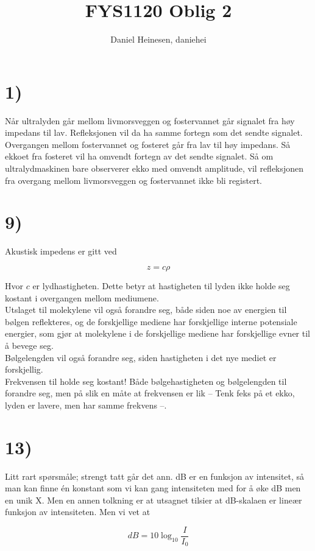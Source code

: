 \documentclass[a4paper,norsk, 10pt]{article}
\title{FYS1120 Oblig 2}
\author{Daniel Heinesen, daniehei}
\begin{document}
\maketitle
\section*{1)}
Når ultralyden går mellom livmorsveggen og fostervannet går signalet fra høy impedans til lav. Refleksjonen vil da ha samme fortegn som det sendte signalet. Overgangen mellom fostervannet og fosteret går fra lav til høy impedans. Så ekkoet fra fosteret vil ha omvendt fortegn av det sendte signalet. Så om  ultralydmaskinen bare observerer ekko med omvendt amplitude, vil refleksjonen fra overgang mellom livmorsveggen og fostervannet ikke bli registert.


\section*{9)}
Akustisk impedens er gitt ved 

$$
z = c\rho
$$

Hvor $c$ er lydhastigheten. Dette betyr at hastigheten til lyden ikke holde seg kostant i overgangen mellom mediumene. \\

Utslaget til molekylene vil også forandre seg, både siden noe av energien til bølgen reflekteres, og de forskjellige mediene har forskjellige interne potensiale energier, som gjør at molekylene i de forskjellige mediene har forskjellige evner til å bevege seg.\\

Bølgelengden vil også forandre seg, siden hastigheten i det nye mediet er forskjellig.\\

Frekvensen til holde seg kostant! Både bølgehastigheten og bølgelengden til forandre seg, men på slik en måte at frekvensen er lik -- Tenk feks på et ekko, lyden er lavere, men har samme frekvens --.

\section*{13)}
Litt rart spørsmåle; strengt tatt går det ann. dB er en funksjon av intensitet, så man kan finne én konstant som vi kan gang intensiteten med for å øke dB men en unik X. Men en annen tolkning er at utsagnet tilsier at dB-skalaen er lineær funksjon av intensiteten. Men vi vet at

$$
dB = 10 \log_{10}\frac{I}{I_0}
$$
\end{document}
